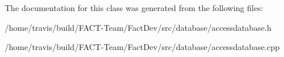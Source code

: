 The documentation for this class was generated from the following files\-:\begin{DoxyCompactItemize}
\item 
/home/travis/build/\-F\-A\-C\-T-\/\-Team/\-Fact\-Dev/src/database/accessdatabase.\-h\item 
/home/travis/build/\-F\-A\-C\-T-\/\-Team/\-Fact\-Dev/src/database/accessdatabase.\-cpp\end{DoxyCompactItemize}

